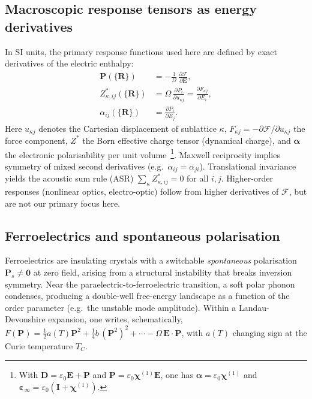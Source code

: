 \documentclass[aps,physrev,graphicx,amsmath,amssymb,
               reprint,superscriptaddress]{revtex4-2}
\begin{document}
\subsection{Macroscopic response tensors as energy derivatives}
In SI units, the primary response functions used here are defined by exact derivatives of the electric enthalpy:
\begin{align}
\mathbf P(\{\mathbf R\}) &= -\frac{1}{\Omega}\,\frac{\partial \mathcal F}{\partial \mathbf E}, \label{eq:P_from_F}\\
Z^*_{\kappa,ij}(\{\mathbf R\}) &= \Omega\,\frac{\partial P_i}{\partial u_{\kappa j}}
= \frac{\partial F_{\kappa j}}{\partial E_i}, \label{eq:Zstar}\\
\alpha_{ij}(\{\mathbf R\}) &= \frac{\partial P_i}{\partial E_j}. \label{eq:alpha}
\end{align}
Here $u_{\kappa j}$ denotes the Cartesian displacement of sublattice $\kappa$, $F_{\kappa j}=-\partial \mathcal F/\partial u_{\kappa j}$ the force component,
$Z^*$ the Born effective charge tensor (dynamical charge), and $\boldsymbol\alpha$ the electronic polarisability per unit volume~\footnote{With $\mathbf D=\varepsilon_0\mathbf E+\mathbf P$ and $\mathbf P=\varepsilon_0\boldsymbol\chi^{(1)}\mathbf E$, one has $\boldsymbol\alpha=\varepsilon_0\boldsymbol\chi^{(1)}$ and $\boldsymbol\varepsilon_\infty=\varepsilon_0(\mathbf I+\boldsymbol\chi^{(1)})$.}. Maxwell reciprocity implies symmetry of mixed second derivatives (e.g.\ $\alpha_{ij}=\alpha_{ji}$). Translational invariance yields the acoustic sum rule (ASR) $\sum_\kappa Z^*_{\kappa,ij}=0$ for all $i,j$. Higher-order responses (nonlinear optics, electro-optic) follow from higher derivatives of $\mathcal F$, but are not our primary focus here.

\subsection{Ferroelectrics and spontaneous polarisation}
Ferroelectrics are insulating crystals with a switchable \emph{spontaneous} polarisation $\mathbf P_s\neq\mathbf 0$ at zero field, arising from a structural instability that breaks inversion symmetry. Near the paraelectric-to-ferroelectric transition, a soft polar phonon condenses, producing a double-well free-energy landscape as a function of the order parameter (e.g.\ the unstable mode amplitude). Within a Landau-Devonshire expansion, one writes, schematically,
$F(\mathbf P)=\tfrac{1}{2}a(T)\mathbf P^2+\tfrac{1}{4}b\,(\mathbf P^2)^2+\cdots-\Omega\,\mathbf E\!\cdot\!\mathbf P$, with $a(T)$ changing sign at the Curie temperature $T_C$.
\end{document}

